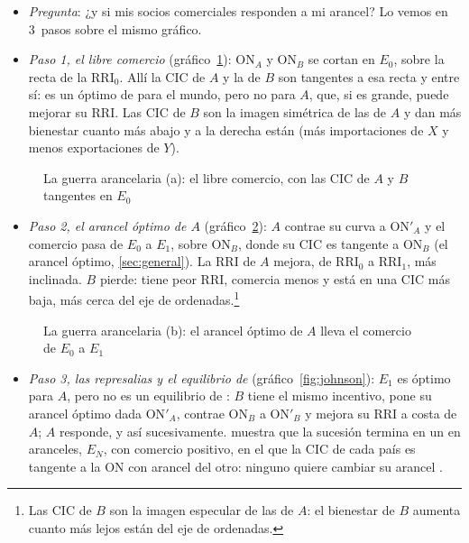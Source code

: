 \documentclass[11pt]{article}
\begin{document}
\begin{itemize}
\item \emph{Pregunta}: ¿y si mis socios comerciales responden a mi arancel? Lo vemos en 3~pasos sobre el mismo gráfico.
\item \emph{Paso 1, el libre comercio} (gráfico~\ref{fig:johnson-a}): ON$_A$ y ON$_B$ se cortan en $E_0$, sobre la recta de la RRI$_0$. Allí la CIC de $A$ y la de $B$ son tangentes a esa recta y entre sí: es un óptimo de  para el mundo, pero no para $A$, que, si es grande, puede mejorar su RRI. Las CIC de $B$ son la imagen simétrica de las de $A$ y dan más bienestar cuanto más abajo y a la derecha están (más importaciones de $X$ y menos exportaciones de $Y$).
\end{itemize}
\begin{figure}[H]
\centering
\caption{La guerra arancelaria (a): el libre comercio, con las CIC de $A$ y $B$ tangentes en $E_0$}\label{fig:johnson-a}
\end{figure}
\begin{itemize}
\item \emph{Paso 2, el arancel óptimo de $A$} (gráfico~\ref{fig:johnson-b}): $A$ contrae su curva a ON$'_A$ y el comercio pasa de $E_0$ a $E_1$, sobre ON$_B$, donde su CIC es tangente a ON$_B$ (el arancel óptimo, \ref{sec:general}). La RRI de $A$ mejora, de RRI$_0$ a RRI$_1$, más inclinada. $B$ pierde: tiene peor RRI, comercia menos y está en una CIC más baja, más cerca del eje de ordenadas.\footnote{Las CIC de $B$ son la imagen especular de las de $A$: el bienestar de $B$ aumenta cuanto más lejos están del eje de ordenadas.}
\end{itemize}
\begin{figure}[H]
\centering
\caption{La guerra arancelaria (b): el arancel óptimo de $A$ lleva el comercio de $E_0$ a $E_1$}\label{fig:johnson-b}
\end{figure}
\begin{itemize}
\item \emph{Paso 3, las represalias y el equilibrio de } (gráfico~\ref{fig:johnson}): $E_1$ es óptimo para $A$, pero no es un equilibrio de : $B$ tiene el mismo incentivo, pone su arancel óptimo dada ON$'_A$, contrae ON$_B$ a ON$'_B$ y mejora su RRI a costa de $A$; $A$ responde, y así sucesivamente. \textcite{Johnson1953Optimum} muestra que la sucesión termina en un  en aranceles, $E_N$, con comercio positivo, en el que la CIC de cada país es tangente a la ON con arancel del otro: ninguno quiere cambiar su arancel .
\end{itemize}
\end{document}
